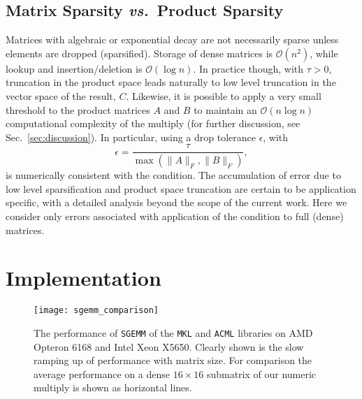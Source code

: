 \subsection{Matrix Sparsity \emph{vs.}~Product Sparsity}

Matrices with algebraic or exponential decay are not necessarily sparse unless
elements are dropped (sparsified). Storage of dense matrices is $\mathcal{O}
\left( n^{2} \right)$, while lookup and insertion/deletion is $\mathcal{O}
\left( \log n \right)$. In practice though, with $\tau > 0$, truncation in the
product space leads naturally to low level truncation in the vector space of
the result, $C$.  Likewise, it is possible to apply a very small threshold to
the product matrices $A$ and $B$ to maintain an $\mathcal{O} \left( n \log n
\right)$ computational complexity of the multiply (for further discussion, see
Sec.~\ref{sec:discussion}). In particular, using a drop tolerance $\epsilon$,
with
\begin{equation}
\epsilon = \frac{\tau}{ \max \left( \lVert A \rVert_{F}, \lVert B \rVert_{F}
\right) },
\end{equation}
is numerically consistent with the \SpAMM{} condition. The accumulation of
error due to low level sparsification and product space truncation are certain
to be application specific, with a detailed analysis beyond the scope of the
current work. Here we consider only errors associated with application of the
\SpAMM{} condition to full (dense) matrices.

\section{Implementation}
\label{sec:implementation}

\begin{figure}
\texttt{[image: sgemm\_comparison]}
\caption{\label{fig:sgemm_comparison} The performance of {\tt SGEMM} of the
{\tt MKL} and {\tt ACML} libraries on AMD Opteron 6168 and Intel Xeon X5650.
Clearly shown is the slow ramping up of performance with matrix size. For
comparison the average performance on a dense $16 \times 16$ submatrix of our
numeric multiply is shown as horizontal lines.}
\end{figure}

